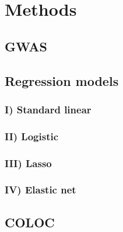 \documentclass[../main.tex]{subfiles}
\begin{document}
\chapter{Methods}

\section{GWAS}

\section{Regression models}

\subsection{I) Standard linear}

\subsection{II) Logistic}

\subsection{III) Lasso}

\subsection{IV) Elastic net}

\section{COLOC}
\end{document}
